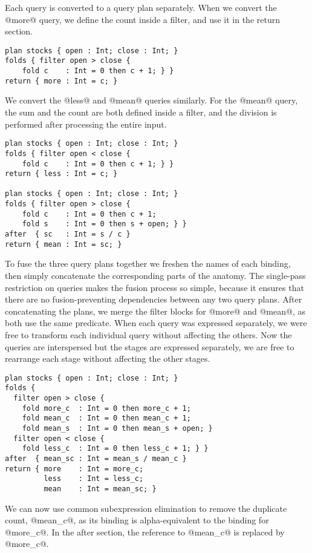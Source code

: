 Each query is converted to a query plan separately.
When we convert the @more@ query, we define the count inside a filter, and use it in the return section.

\begin{lstlisting}
plan stocks { open : Int; close : Int; }
folds { filter open > close {
    fold c    : Int = 0 then c + 1; } }
return { more : Int = c; }
\end{lstlisting}

We convert the @less@ and @mean@ queries similarly.
For the @mean@ query, the sum and the count are both defined inside a filter, and the division is performed after processing the entire input.

\begin{lstlisting}
plan stocks { open : Int; close : Int; }
folds { filter open < close {
    fold c    : Int = 0 then c + 1; } }
return { less : Int = c; }

plan stocks { open : Int; close : Int; }
folds { filter open > close {
    fold c    : Int = 0 then c + 1;
    fold s    : Int = 0 then s + open; } }
after  { sc   : Int = s / c }
return { mean : Int = sc; }
\end{lstlisting}

To fuse the three query plans together we freshen the names of each binding, then simply concatenate the corresponding parts of the anatomy.
The single-pass restriction on queries makes the fusion process so simple, because it ensures that there are no fusion-preventing dependencies between any two query plans. 
After concatenating the plans, we merge the filter blocks for @more@ and @mean@, as both use the same predicate.
When each query was expressed separately, we were free to transform each individual query without affecting the others.
Now the queries are interspersed but the stages are expressed separately, we are free to rearrange each stage without affecting the other stages.

\begin{lstlisting}
plan stocks { open : Int; close : Int; }
folds {
  filter open > close {
    fold more_c  : Int = 0 then more_c + 1;
    fold mean_c  : Int = 0 then mean_c + 1;
    fold mean_s  : Int = 0 then mean_s + open; }
  filter open < close {
    fold less_c  : Int = 0 then less_c + 1; } }
after  { mean_sc : Int = mean_s / mean_c }
return { more    : Int = more_c;
         less    : Int = less_c;
         mean    : Int = mean_sc; }
\end{lstlisting}

We can now use common subexpression elimination to remove the duplicate count, @mean_c@, as its binding is alpha-equivalent to the binding for @more_c@.
In the after section, the reference to @mean_c@ is replaced by @more_c@.

